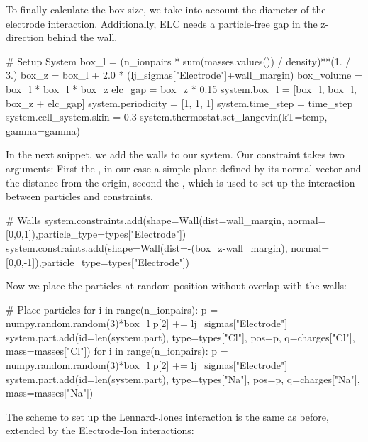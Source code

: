 \documentclass[
a4paper,                        %
11pt,                           %
twoside,                        %
footsepline,                    %
headsepline,                    %
headexclude,                    %
footexclude,                    %
pagesize,                       %
]{scrartcl}
\begin{document}
To finally calculate the box size, we take into account the diameter of the electrode interaction.
Additionally, ELC needs a particle-free gap in the z-direction behind the wall.

\begin{pypresso}
# Setup System
box_l = (n_ionpairs * sum(masses.values()) / density)**(1. / 3.)
box_z = box_l + 2.0 * (lj_sigmas["Electrode"]+wall_margin)
box_volume = box_l * box_l * box_z
elc_gap = box_z * 0.15
system.box_l = [box_l, box_l, box_z + elc_gap]
system.periodicity = [1, 1, 1]
system.time_step = time_step
system.cell_system.skin = 0.3
system.thermostat.set_langevin(kT=temp, gamma=gamma)
\end{pypresso}

In the next snippet, we add the walls to our system. Our constraint takes two arguments: 
First the , in our case a simple plane defined by its normal vector and the distance from the origin, 
second the , which is used to set up the interaction between particles and constraints.

\begin{pypresso}
# Walls   
system.constraints.add(shape=Wall(dist=wall_margin,
            normal=[0,0,1]),particle_type=types["Electrode"])
system.constraints.add(shape=Wall(dist=-(box_z-wall_margin),
            normal=[0,0,-1]),particle_type=types["Electrode"])
\end{pypresso}

Now we place the particles at random position without overlap with the walls:

\begin{pypresso}
# Place particles
for i in range(n_ionpairs):
    p = numpy.random.random(3)*box_l
    p[2] += lj_sigmas["Electrode"]
    system.part.add(id=len(system.part), type=types["Cl"],  pos=p, q=charges["Cl"], mass=masses["Cl"])
for i in range(n_ionpairs):
    p = numpy.random.random(3)*box_l
    p[2] += lj_sigmas["Electrode"]
    system.part.add(id=len(system.part), type=types["Na"],  pos=p, q=charges["Na"], mass=masses["Na"])
\end{pypresso}

The scheme to set up the Lennard-Jones interaction is the same as before, 
extended by the Electrode-Ion interactions:
\end{document}
